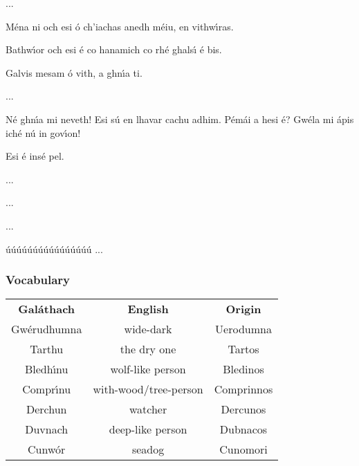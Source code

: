 \begin{leftbubbles}...\end{leftbubbles}
\begin{rightbubbles}M\'{e}na ni och esi \'{o} ch’iachas anedh m\'{e}iu, en vithw\'{\i}ras.\end{rightbubbles}
\begin{rightbubbles}Bathw\'{\i}or och esi \'{e} co hanamich co rh\'{e} ghals\'{\i} \'{e} bis.\end{rightbubbles}
\begin{rightbubbles}Galvis mesam \'{o} vith, a ghn\'{\i}a ti.\end{rightbubbles}
\begin{rightbubbles}...\end{rightbubbles}
\begin{leftbubbles}N\'{e} ghn\'{\i}a mi neveth! Esi s\'{u} en lhavar cachu adhim. P\'{e}m\'{a}i a hesi \'{e}? Gw\'{e}la mi \'{a}pis ich\'{e} n\'{u} in gov\'{\i}on!\end{leftbubbles}
\begin{rightbubbles}Esi \'{e} ins\'{e} pel.\end{rightbubbles}
\begin{rightbubbles}...\end{rightbubbles}
\begin{rightbubbles}...\end{rightbubbles}
\begin{rightbubbles}...\end{rightbubbles}
\begin{rightbubbles}\'{u}\'{u}\'{u}\'{u}\'{u}\'{u}\'{u}\'{u}\'{u}\'{u}\'{u}\'{u}\'{u}\'{u}\'{u}\'{u} ...\end{rightbubbles}
\endgroup

\newpage
\subsubsection{Vocabulary}

\begin{table}[H]
\centering
\begin{tabular}{ccc}
  \toprule
  \textbf{Gal\'{a}thach} & \textbf{English} & \textbf{Origin}\\
  \cmidrule(lr){1-1}\cmidrule(lr){2-2}\cmidrule(lr){3-3}
  Gw\'{e}rudhumna & wide-dark & Uerodumna\\
  Tarthu & the dry one & Tartos\\
  Bledh\'{\i}nu & wolf-like person & Bledinos\\
  Compr\'{\i}nu & with-wood/tree-person & Comprinnos\\
  Derchun & watcher & Dercunos\\
  Duvnach & deep-like person & Dubnacos\\
  Cunw\'{o}r & seadog & Cunomori\\
  \bottomrule
\end{tabular}
\label{vocab_conversation_spatial_system}
\end{table}

